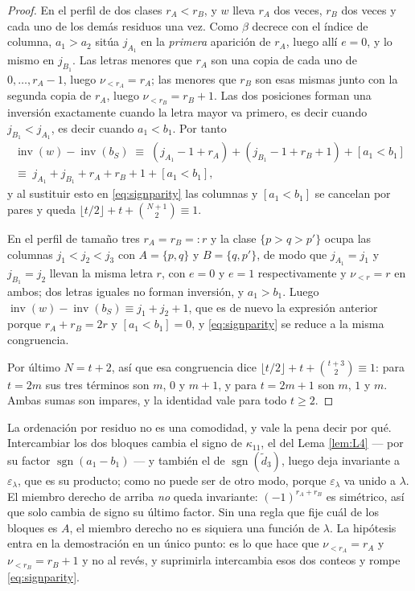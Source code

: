 \documentclass[11pt,reqno]{amsart}
\theoremstyle{plain}
\theoremstyle{definition}
\newcommand{\inv}{\operatorname{inv}}
\newcommand{\sgn}{\operatorname{sgn}}
\begin{document}
\begin{proof}
En el perfil de dos clases $r_A<r_B$, y $w$ lleva $r_A$ dos veces, $r_B$ dos veces y cada uno de los
demás residuos una vez. Como $\beta$ decrece con el índice de columna, $a_1>a_2$ sitúa $j_{A_1}$ en
la \emph{primera} aparición de $r_A$, luego allí $e=0$, y lo mismo en $j_{B_1}$. Las letras menores
que $r_A$ son una copia de cada uno de $0,\dots,r_A-1$, luego $\nu_{<r_A}=r_A$; las menores que $r_B$
son esas mismas junto con la segunda copia de $r_A$, luego $\nu_{<r_B}=r_B+1$. Las dos posiciones
forman una inversión exactamente cuando la letra mayor va primero, es decir cuando
$j_{B_1}<j_{A_1}$, es decir cuando $a_1<b_1$. Por tanto
\begin{multline*}
\inv(w)-\inv(b_S)\;\equiv\;(j_{A_1}-1+r_A)+(j_{B_1}-1+r_B+1)+[a_1<b_1]\\
\equiv\;j_{A_1}+j_{B_1}+r_A+r_B+1+[a_1<b_1],
\end{multline*}
y al sustituir esto en \eqref{eq:signparity} las columnas y $[a_1<b_1]$ se cancelan por pares y queda
$\lfloor t/2\rfloor+t+\binom{N+1}{2}\equiv1$.

En el perfil de tamaño tres $r_A=r_B=:r$ y la clase $\{p>q>p'\}$ ocupa las columnas $j_1<j_2<j_3$ con
$A=\{p,q\}$ y $B=\{q,p'\}$, de modo que $j_{A_1}=j_1$ y $j_{B_1}=j_2$ llevan la misma letra $r$, con
$e=0$ y $e=1$ respectivamente y $\nu_{<r}=r$ en ambos; dos letras iguales no forman inversión, y
$a_1>b_1$. Luego $\inv(w)-\inv(b_S)\equiv j_1+j_2+1$, que es de nuevo la expresión anterior porque
$r_A+r_B=2r$ y $[a_1<b_1]=0$, y \eqref{eq:signparity} se reduce a la misma congruencia.

Por último $N=t+2$, así que esa congruencia dice
$\lfloor t/2\rfloor+t+\binom{t+3}{2}\equiv1$: para $t=2m$ sus tres términos son $m$, $0$ y $m+1$, y
para $t=2m+1$ son $m$, $1$ y $m$. Ambas sumas son impares, y la identidad vale para todo $t\ge2$.
\end{proof}

La ordenación por residuo no es una comodidad, y vale la pena decir por qué. Intercambiar los dos
bloques cambia el signo de $\kappa_{11}$, el del Lema \ref{lem:L4} --- por su factor
$\sgn(a_1-b_1)$ --- y también el de
$\sgn(\tilde d_3)$, luego deja invariante a $\varepsilon_\lambda$, que es su producto; como no
puede ser de otro modo, porque $\varepsilon_\lambda$ va unido a $\lambda$. El miembro derecho de
arriba \emph{no} queda invariante: $(-1)^{r_A+r_B}$ es simétrico, así que solo cambia de signo su
último factor. Sin una regla que fije cuál de los bloques es $A$, el miembro derecho no es siquiera
una función de $\lambda$. La hipótesis entra en la demostración en un único punto: es lo que hace
que $\nu_{<r_A}=r_A$ y $\nu_{<r_B}=r_B+1$ y no al revés, y suprimirla intercambia esos dos conteos y
rompe \eqref{eq:signparity}.
\end{document}
